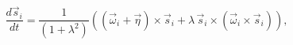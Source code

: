 \documentclass[preview]{standalone}
\begin{document}
\begin{varwidth}{50in}
  \begin{equation}
    \frac{d \vec{s}_{i}}{dt} = \frac{1}{\left(1+\lambda^2 \right)} \left( \left(
    \vec{\omega}_{i} +\vec{\eta} \right) \times \vec{s}_{i} + \lambda\, \vec{s}_{i}
  \times\left( \vec{\omega}_{i} \times\vec{s}_{i} \right) \right), \nonumber
  \end{equation}
\end{varwidth}
\end{document}
